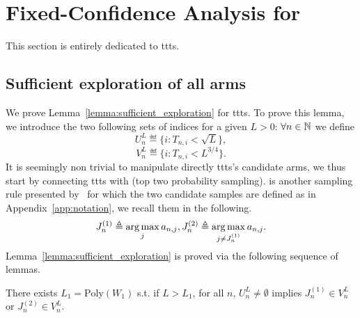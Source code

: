 \section{Fixed-Confidence Analysis for \texorpdfstring{\TTTS}{}}\label{app:confidence_ttts}

This section is entirely dedicated to \gls{ttts}.

\subsection{Sufficient exploration of all arms}\label{app:confidence_ttts.exploration}

We prove Lemma~\ref{lemma:sufficient_exploration} for \gls{ttts}. To prove this lemma, we introduce the two following sets of indices for a given $L>0$: $\forall n\in{\mathbb N}$ we define
\[
    U_n^L \eqdef \{i: T_{n,i} < \sqrt{L}\},
\]
\[
    V_n^L \eqdef \{i: T_{n,i} < L^{3/4}\}.
\]
It is seemingly non trivial to manipulate directly \gls{ttts}'s candidate arms, we thus start by connecting \gls{ttts} with \TTPS (top two probability sampling). \TTPS is another sampling rule presented by~\cite{russo2016ttts} for which the two candidate samples are defined as in Appendix~\ref{app:notation}, we recall them in the following.
\[
    J_n^{(1)} \triangleq \operatorname*{arg\,max}_{j} a_{n,j}, J_n^{(2)} \triangleq \operatorname*{arg\,max}_{j\neq J_n^{(1)}} a_{n,j}.
\]
Lemma~\ref{lemma:sufficient_exploration} is proved via the following sequence of lemmas.

\begin{lemma}\label{lemma:link_ttps}
    There exists $L_1 = \text{Poly}(W_1)$ s.t. if $L > L_1$, for all $n$, $U_n^L \neq \emptyset$ implies $J_n^{(1)} \in V_n^L$ or $J_n^{(2)} \in V_n^L$.
\end{lemma}

